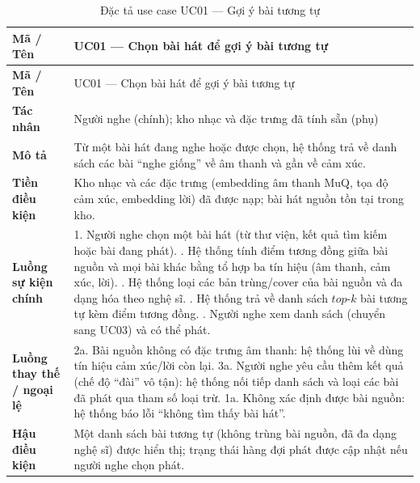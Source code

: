 \documentclass[../DoAn.tex]{subfiles}
\begin{document}
\begin{longtable}{|p{3.0cm}|p{11.0cm}|}
\caption{Đặc tả use case UC01 --- Gợi ý bài tương tự}\label{table:uc01}\\
\hline
\textbf{Mã / Tên} & UC01 --- Chọn bài hát để gợi ý bài tương tự \\
\hline
\endfirsthead
\hline
\textbf{Mã / Tên} & UC01 --- Chọn bài hát để gợi ý bài tương tự \\
\hline
\endhead
\textbf{Tác nhân} & Người nghe (chính); kho nhạc và đặc trưng đã tính sẵn (phụ) \\ \hline
\textbf{Mô tả} & Từ một bài hát đang nghe hoặc được chọn, hệ thống trả về danh sách các bài ``nghe giống'' về âm thanh và gần về cảm xúc. \\ \hline
\textbf{Tiền điều kiện} & Kho nhạc và các đặc trưng (embedding âm thanh MuQ, tọa độ cảm xúc, embedding lời) đã được nạp; bài hát nguồn tồn tại trong kho. \\ \hline
\textbf{Luồng sự kiện chính} & 1. Người nghe chọn một bài hát (từ thư viện, kết quả tìm kiếm hoặc bài đang phát). \newline 2. Hệ thống tính điểm tương đồng giữa bài nguồn và mọi bài khác bằng tổ hợp ba tín hiệu (âm thanh, cảm xúc, lời). \newline 3. Hệ thống loại các bản trùng/cover của bài nguồn và đa dạng hóa theo nghệ sĩ. \newline 4. Hệ thống trả về danh sách $top\text{-}k$ bài tương tự kèm điểm tương đồng. \newline 5. Người nghe xem danh sách (chuyển sang UC03) và có thể phát. \\ \hline
\textbf{Luồng thay thế / ngoại lệ} & 2a. Bài nguồn không có đặc trưng âm thanh: hệ thống lùi về dùng tín hiệu cảm xúc/lời còn lại. \newline 3a. Người nghe yêu cầu thêm kết quả (chế độ ``đài'' vô tận): hệ thống nối tiếp danh sách và loại các bài đã phát qua tham số loại trừ. \newline 1a. Không xác định được bài nguồn: hệ thống báo lỗi ``không tìm thấy bài hát''. \\ \hline
\textbf{Hậu điều kiện} & Một danh sách bài tương tự (không trùng bài nguồn, đã đa dạng nghệ sĩ) được hiển thị; trạng thái hàng đợi phát được cập nhật nếu người nghe chọn phát. \\ \hline
\end{longtable}
\end{document}
